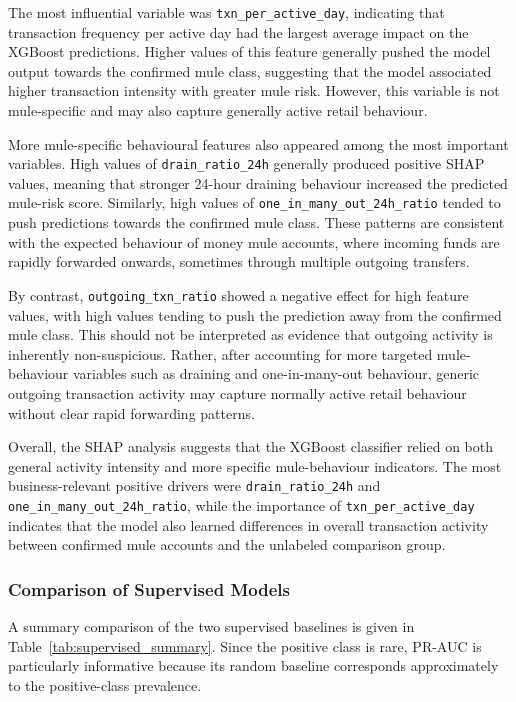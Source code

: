 The most influential variable was \texttt{txn\_per\_active\_day}, indicating that transaction frequency per active day had the largest average impact on the XGBoost predictions. Higher values of this feature generally pushed the model output towards the confirmed mule class, suggesting that the model associated higher transaction intensity with greater mule risk. However, this variable is not mule-specific and may also capture generally active retail behaviour.

More mule-specific behavioural features also appeared among the most important variables. High values of \texttt{drain\_ratio\_24h} generally produced positive SHAP values, meaning that stronger 24-hour draining behaviour increased the predicted mule-risk score. Similarly, high values of \texttt{one\_in\_many\_out\_24h\_ratio} tended to push predictions towards the confirmed mule class. These patterns are consistent with the expected behaviour of money mule accounts, where incoming funds are rapidly forwarded onwards, sometimes through multiple outgoing transfers.

By contrast, \texttt{outgoing\_txn\_ratio} showed a negative effect for high feature values, with high values tending to push the prediction away from the confirmed mule class. This should not be interpreted as evidence that outgoing activity is inherently non-suspicious. Rather, after accounting for more targeted mule-behaviour variables such as draining and one-in-many-out behaviour, generic outgoing transaction activity may capture normally active retail behaviour without clear rapid forwarding patterns.

Overall, the SHAP analysis suggests that the XGBoost classifier relied on both general activity intensity and more specific mule-behaviour indicators. The most business-relevant positive drivers were \texttt{drain\_ratio\_24h} and \texttt{one\_in\_many\_out\_24h\_ratio}, while the importance of \texttt{txn\_per\_active\_day} indicates that the model also learned differences in overall transaction activity between confirmed mule accounts and the unlabeled comparison group.
\subsubsection{Comparison of Supervised Models}

A summary comparison of the two supervised baselines is given in Table~\ref{tab:supervised_summary}. Since the positive class is rare, PR-AUC is particularly informative because its random baseline corresponds approximately to the positive-class prevalence.

